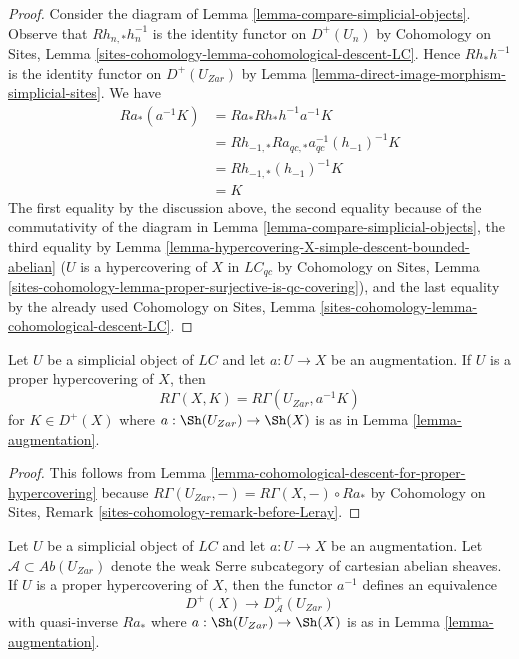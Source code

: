 \begin{proof}
Consider the diagram of Lemma \ref{lemma-compare-simplicial-objects}.
Observe that $Rh_{n, *}h_n^{-1}$ is the identity functor
on $D^+(U_n)$ by Cohomology on Sites, Lemma
\ref{sites-cohomology-lemma-cohomological-descent-LC}.
Hence $Rh_*h^{-1}$ is the identity functor on
$D^+(U_{Zar})$ by
Lemma \ref{lemma-direct-image-morphism-simplicial-sites}.
We have
\begin{align*}
Ra_*(a^{-1}K)
& =
Ra_*Rh_*h^{-1}a^{-1}K \\
& =
Rh_{-1, *}Ra_{qc, *}a_{qc}^{-1}(h_{-1})^{-1}K \\
& =
Rh_{-1, *}(h_{-1})^{-1}K \\
& =
K
\end{align*}
The first equality by the discussion above, the second equality
because of the commutativity of the diagram in
Lemma \ref{lemma-compare-simplicial-objects}, the third equality by
Lemma \ref{lemma-hypercovering-X-simple-descent-bounded-abelian}
($U$ is a hypercovering of $X$ in $\textit{LC}_{qc}$ by
Cohomology on Sites, Lemma
\ref{sites-cohomology-lemma-proper-surjective-is-qc-covering}),
and the last equality by the already used Cohomology on Sites, Lemma
\ref{sites-cohomology-lemma-cohomological-descent-LC}.
\end{proof}

\begin{lemma}
\label{lemma-compute-via-proper-hypercovering}
Let $U$ be a simplicial object of $\textit{LC}$ and let $a : U \to X$
be an augmentation. If $U$ is a proper hypercovering of $X$, then
$$
R\Gamma(X, K) = R\Gamma(U_{Zar}, a^{-1}K)
$$
for $K \in D^+(X)$ where $a : \Sh(U_{Zar}) \to \Sh(X)$
is as in Lemma \ref{lemma-augmentation}.
\end{lemma}

\begin{proof}
This follows from
Lemma \ref{lemma-cohomological-descent-for-proper-hypercovering}
because $R\Gamma(U_{Zar}, -) = R\Gamma(X, -) \circ Ra_*$ by
Cohomology on Sites, Remark \ref{sites-cohomology-remark-before-Leray}.
\end{proof}

\begin{lemma}
\label{lemma-proper-hypercovering-equivalence-bounded}
Let $U$ be a simplicial object of $\textit{LC}$ and let $a : U \to X$
be an augmentation.
Let $\mathcal{A} \subset \textit{Ab}(U_{Zar})$
denote the weak Serre subcategory of cartesian abelian sheaves.
If $U$ is a proper hypercovering of $X$, then
the functor $a^{-1}$ defines an equivalence
$$
D^+(X) \longrightarrow D_\mathcal{A}^+(U_{Zar})
$$
with quasi-inverse $Ra_*$ where $a : \Sh(U_{Zar}) \to \Sh(X)$
is as in Lemma \ref{lemma-augmentation}.
\end{lemma}

